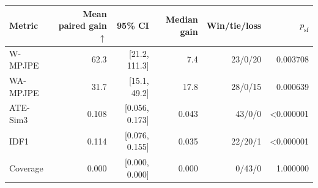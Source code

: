 \begin{tabular}{lrrrrr}
\toprule
Metric & Mean paired gain $\uparrow$ & 95\% CI & Median gain & Win/tie/loss & $p_{\mathrm{sf}}$ \\
\midrule
W-MPJPE & 62.3 & [21.2, 111.3] & 7.4 & 23/0/20 & 0.003708 \\
WA-MPJPE & 31.7 & [15.1, 49.2] & 17.8 & 28/0/15 & 0.000639 \\
ATE-Sim3 & 0.108 & [0.056, 0.173] & 0.043 & 43/0/0 & <0.000001 \\
IDF1 & 0.114 & [0.076, 0.155] & 0.035 & 22/20/1 & <0.000001 \\
Coverage & 0.000 & [0.000, 0.000] & 0.000 & 0/43/0 & 1.000000 \\
\bottomrule
\end{tabular}
